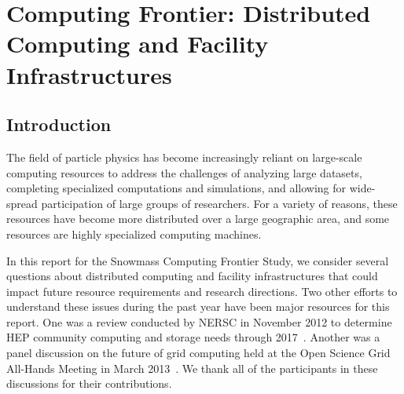  
\chapter{Computing Frontier: Distributed Computing and Facility Infrastructures}
\label{chap:mag}


\begin{center}\begin{boldmath}



\end{boldmath}\end{center}


\section{Introduction}
\label{sec:comp-intro}

The field of particle physics has become increasingly reliant on large-scale computing resources to address the challenges of analyzing large datasets, completing specialized computations and simulations, and allowing for wide-spread participation of large groups of researchers.  For a variety of reasons, these resources have become more distributed over a large geographic area, and some resources are highly specialized computing machines.

In this report for the Snowmass Computing Frontier Study, we consider several questions about distributed computing and facility infrastructures that could impact future resource requirements and research directions.  Two other efforts to understand these issues during the past year have been major resources for this report.  One was a review conducted by NERSC in November 2012 to determine HEP community computing and storage needs through 2017~\cite{bib:NERSCreport}.  Another was a panel discussion on the future of grid computing held at the Open Science Grid All-Hands Meeting in March 2013~\cite{bib:OSGpanel}.  We thank all of the participants in these discussions for their contributions.

